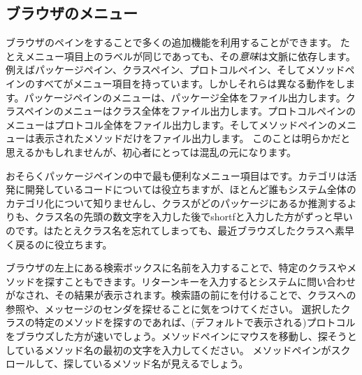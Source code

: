 \documentclass[a4paper,10pt,twoside]{book}
\begin{document}
\subsection{ブラウザのメニュー}

ブラウザのペインを\actclick することで多くの追加機能を利用することができます。
たとえメニュー項目上のラベルが同じであっても、その\emph{意味}は文脈に依存します。
例えばパッケージペイン、クラスペイン、プロトコルペイン、そしてメソッドペインのすべてがメニュー項目を持っています。しかしそれらは異なる動作をします。パッケージペインのメニューは、パッケージ全体をファイル出力します。クラスペインのメニューはクラス全体をファイル出力します。プロトコルペインのメニューはプロトコル全体をファイル出力します。そしてメソッドペインのメニューは表示されたメソッドだけをファイル出力します。
このことは明らかだと思えるかもしれませんが、初心者にとっては混乱の元になります。

おそらくパッケージペインの中で最も便利なメニュー項目はです。カテゴリは活発に開発しているコードについては役立ちますが、ほとんど誰もシステム全体のカテゴリ化について知りませんし、クラスがどのパッケージにあるか推測するよりも、クラス名の先頭の数文字を入力した後でshort{f}と入力した方がずっと早いのです。はたとえクラス名を忘れてしまっても、最近ブラウズしたクラスへ素早く戻るのに役立ちます。

ブラウザの左上にある検索ボックスに名前を入力することで、特定のクラスやメソッドを探すこともできます。リターンキーを入力するとシステムに問い合わせがなされ、その結果が表示されます。検索語の前に\ct{#}を付けることで、クラスへの参照や、メッセージのセンダを探せることに気をつけてください。
選択したクラスの特定のメソッドを探すのであれば、(デフォルトで表示される)プロトコルをブラウズした方が速いでしょう。メソッドペインにマウスを移動し、探そうとしているメソッド名の最初の文字を入力してください。
メソッドペインがスクロールして、探しているメソッド名が見えるでしょう。

\end{document}
